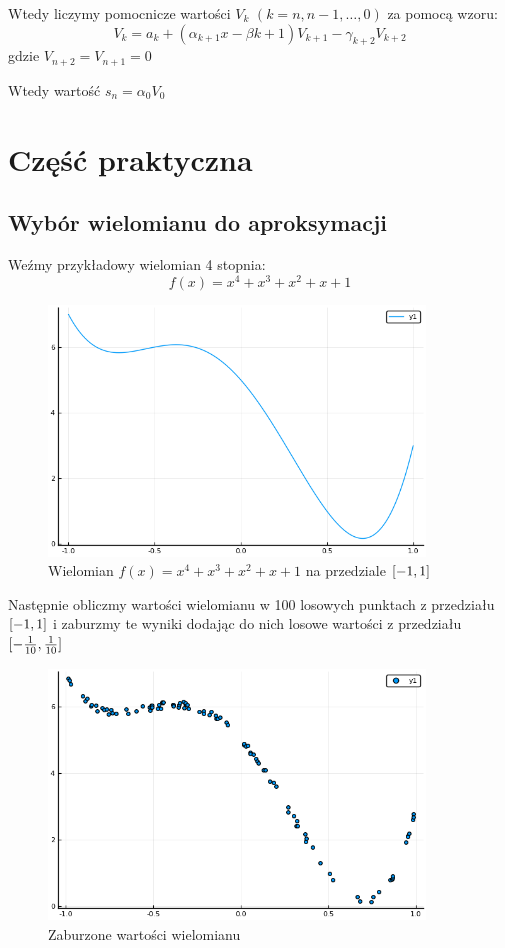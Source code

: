 \documentclass[11pt]{article}
\begin{document}
Wtedy liczymy pomocnicze wartości $V_k$ $(k = n, n-1, \dots, 0)$ za pomocą wzoru:
\begin{equation*}
V_k = a_k + (\alpha_{k+1}x - \beta{k+1})V_{k+1} - \gamma_{k+2}V_{k+2}
\end{equation*}
gdzie $V_{n+2} = V_{n+1} = 0 $ 

Wtedy wartość $s_n = \alpha_0V_0$

\section{Część praktyczna}
\subsection{Wybór wielomianu do aproksymacji}
Weźmy przykładowy wielomian 4 stopnia:
\begin{equation}
f(x) = x^4 + x^3 + x^2 + x + 1
\end{equation}
\begin{figure}[!htbp]
  \includegraphics[width=10cm]{poczatkowy.png}
  \centering
  \caption{Wielomian $f(x) = x^4 + x^3 + x^2 + x + 1$ na przedziale $\interval{-1}{1}$}
  \label{fig:wykres1}
\end{figure}
Następnie obliczmy wartości wielomianu w 100 losowych punktach z przedziału $\interval{-1}{1}$ i zaburzmy te wyniki dodając do nich losowe wartości z przedziału $\interval{-\frac{1}{10}}{\frac{1}{10}}$

\begin{figure}[!htbp]
  \includegraphics[width=10cm]{zaburzone.png}
  \centering
  \caption{Zaburzone wartości wielomianu}
  \label{fig:wykres2}
\end{figure}
\end{document}
